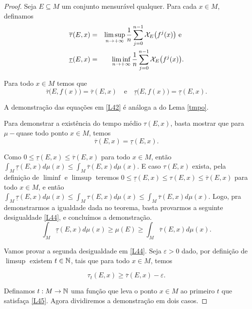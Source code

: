 \begin{proof}
Seja $E\subseteq M$ um conjunto mensurável qualquer. Para cada $x\in M$, definamos
\begin{eqnarray*}
\overline{\tau}(E,x) & = & \limsup_{n\to+\infty}\dfrac{1}{n}\sum_{j=0}^{n-1}\mathcal{X}_{E}\big(f^j(x)\big)\text{ e }\\
\underline{\tau}(E,x) & = & \liminf_{n\to+\infty}\dfrac{1}{n}\sum_{j=0}^{n-1}\mathcal{X}_{E}\big(f^j(x)\big).
\end{eqnarray*}

Para todo $x\in M$ temos que
\begin{equation}\label{L42}
\overline{\tau}\big(E,f(x)\big)=\overline{\tau}(E,x)\quad\text{e}\quad\underline{\tau}\big(E,f(x)\big)=\underline{\tau}(E,x).
\end{equation}

A demonstração das equações em \eqref{L42} é análoga a do Lema \ref{tmpo}.

Para demonstrar a existência do tempo médio $\tau(E,x)$, basta mostrar que para $\mu-$quase todo ponto $x\in M$, temos
\begin{equation}
\overline{\tau}(E,x)=\underline{\tau}(E,x).
\end{equation}

Como $0\leq\underline{\tau}(E,x)\leq\overline{\tau}(E,x)$ para todo $x\in M$, então $\int_{M}\underline{\tau}(E,x)d\mu(x)\leq\int_{M}\overline{\tau}(E,x)d\mu(x)$. E caso $\tau(E,x)$ exista, pela definição de $\liminf$ e $\limsup$ teremos $0\leq\underline{\tau}(E,x)\leq\tau(E,x)\leq\overline{\tau}(E,x)$ para todo $x\in M$, e então $\int_{M}\underline{\tau}(E,x)d\mu(x)\leq\int_{M}\tau(E,x)d\mu(x)\leq\int_{M}\overline{\tau}(E,x)d\mu(x)$. Logo, pra demonstrarmos a igualdade dada no teorema, basta provarmos a seguinte desigualdade \eqref{L44}, e concluímos a demonstração.
\begin{equation}\label{L44}
\int_{M}\underline{\tau}(E,x)d\mu(x)\geq\mu(E)\geq\int_{M}\overline{\tau}(E,x)d\mu(x).
\end{equation}

Vamos provar a segunda desigualdade em \eqref{L44}. Seja $\varepsilon>0$ dado, por definição de $\limsup$ existem $t\in\mathbb{N}$, tais que para todo $x\in M$, temos

\vspace{-0.5cm}\begin{equation}\label{L45}
\tau_t(E,x)\geq\overline{\tau}(E,x)-\varepsilon.
\end{equation}

Definamos $t:M \rightarrow \mathbb{N}$ uma função que leva o ponto $x\in M$ ao primeiro $t$ que satisfaça \eqref{L45}. Agora dividiremos a demonstração em dois casos.


\end{proof}
